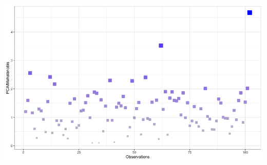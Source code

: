 \documentclass[20pt,landscape,footrule,headrule]{foils}
\begin{document}
{{\begin{center}
\includegraphics[width=\textwidth]{Images/PCA_Maha2}
\end{center}

}}
\end{document}
